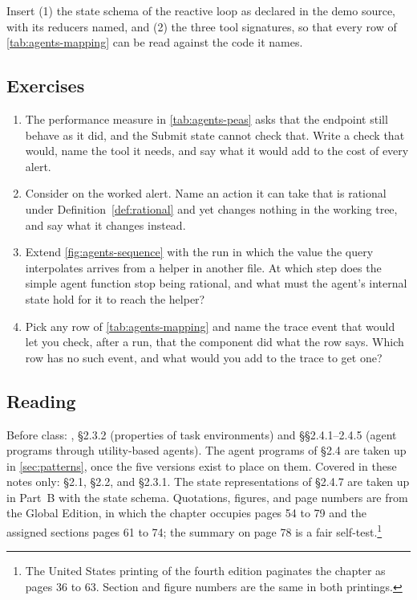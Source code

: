 \begin{demostub}
Insert (1) the state schema of the reactive loop as declared in the demo source, with its
reducers named, and
(2) the three tool signatures, so that every row of \cref{tab:agents-mapping} can be read against
the code it names.
\end{demostub}

\subsection{Exercises}

\begin{enumerate}
  \item The performance measure in \cref{tab:agents-peas} asks that the endpoint still behave as
  it did, and the Submit state cannot check that. Write a check that would, name the tool it
  needs, and say what it would add to the cost of every alert.
  \item Consider \msa{} on the worked alert. Name an action it can take that is rational under
  Definition~\ref{def:rational} and yet changes nothing in the working tree, and say what it
  changes instead.
  \item Extend \cref{fig:agents-sequence} with the run in which the value the query interpolates
  arrives from a helper in another file. At which step does the simple agent function stop being
  rational, and what must the agent's internal state hold for it to reach the helper?
  \item Pick any row of \cref{tab:agents-mapping} and name the trace event that would let you
  check, after a run, that the component did what the row says. Which row has no such event, and
  what would you add to the trace to get one?
\end{enumerate}

\subsection{Reading}

Before class: \citet{russell2020aima}, \S2.3.2 (properties of task environments) and
\S\S2.4.1--2.4.5 (agent programs through utility-based agents). The agent programs of \S2.4 are
taken up in \cref{sec:patterns}, once the five versions exist to place on them.
Covered in these notes only: \S2.1, \S2.2, and \S2.3.1. The state representations of \S2.4.7 are
taken up in Part~B with the state schema. Quotations, figures, and page numbers are from the
Global Edition, in which the chapter occupies pages 54 to 79 and the assigned sections pages 61
to 74; the summary on page 78 is a fair self-test.\footnote{The United States printing of the
fourth edition paginates the chapter as pages 36 to 63. Section and figure numbers are the same
in both printings.}

